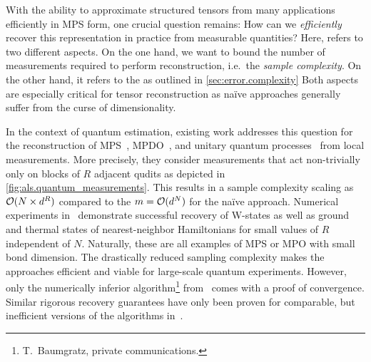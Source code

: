 With the ability to approximate structured tensors from many applications efficiently in MPS form, one crucial question remains:
How can we \emph{efficiently} recover this representation in practice from measurable quantities?
Here,  refers to two different aspects.
On the one hand, we want to bound the number of measurements required to perform reconstruction, i.e.\ the \emph{sample complexity}.
On the other hand, it refers to the  as outlined in \cref{sec:error.complexity}
Both aspects are especially critical for tensor reconstruction as na\"ive approaches generally suffer from the curse of dimensionality.

In the context of quantum estimation, existing work addresses this question for the reconstruction of MPS~\cite{Cramer_2010_Efficient}, MPDO~\cite{Baumgratz_2013_Scalable,Baumgratz_2013_Scalablea,Lanyon_2017_Efficient}, and unitary quantum processes~\cite{Holzaepfel_2014_Scalable} from local measurements.
More precisely, they consider measurements that act non-trivially only on blocks of $R$ adjacent qudits as depicted in \cref{fig:als.quantum_measurements}.
This results in a sample complexity scaling as ${\mathcal{O}}(N \times d^R)$ compared to the $m = {\mathcal{O}}(d^N)$ for the na\"ive approach.
Numerical experiments in~\cite{Cramer_2010_Efficient,Baumgratz_2013_Scalable,Baumgratz_2013_Scalablea} demonstrate successful recovery of W-states as well as ground and thermal states of nearest-neighbor Hamiltonians for small values of $R$ independent of $N$.
Naturally, these are all examples of MPS or MPO with small bond dimension.
The drastically reduced sampling complexity makes the approaches efficient and viable for large-scale quantum experiments.
However, only the numerically inferior algorithm\footnote{%
  T.\ Baumgratz, private communications.
}
from~\cite{Baumgratz_2013_Scalable} comes with a proof of convergence.
Similar rigorous recovery guarantees have only been proven for comparable, but inefficient versions of the algorithms in~\cite{Cramer_2010_Efficient,Baumgratz_2013_Scalablea}.\\



